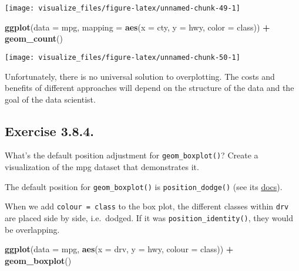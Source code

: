 \documentclass[]{book}
\newenvironment{Shaded}{\begin{snugshade}}{\end{snugshade}}
\newcommand{\DataTypeTok}[1]{\textcolor[rgb]{0.13,0.29,0.53}{#1}}
\newcommand{\KeywordTok}[1]{\textcolor[rgb]{0.13,0.29,0.53}{\textbf{#1}}}
\newcommand{\NormalTok}[1]{#1}
\newcommand{\OperatorTok}[1]{\textcolor[rgb]{0.81,0.36,0.00}{\textbf{#1}}}
\newcommand{\StringTok}[1]{\textcolor[rgb]{0.31,0.60,0.02}{#1}}
\theoremstyle{plain}
\theoremstyle{remark}
\begin{document}
\begin{center}\texttt{[image: visualize\_files/figure-latex/unnamed-chunk-49-1]} \end{center}

\begin{Shaded}
\begin{Highlighting}[]
\KeywordTok{ggplot}\NormalTok{(}\DataTypeTok{data =}\NormalTok{ mpg, }\DataTypeTok{mapping =} \KeywordTok{aes}\NormalTok{(}\DataTypeTok{x =}\NormalTok{ cty, }\DataTypeTok{y =}\NormalTok{ hwy, }\DataTypeTok{color =}\NormalTok{ class)) }\OperatorTok{+}
\StringTok{  }\KeywordTok{geom_count}\NormalTok{()}
\end{Highlighting}
\end{Shaded}

\begin{center}\texttt{[image: visualize\_files/figure-latex/unnamed-chunk-50-1]} \end{center}

Unfortunately, there is no universal solution to overplotting. The costs
and benefits of different approaches will depend on the structure of the
data and the goal of the data scientist.

\hypertarget{exercise-3.8.4.}{%
\subsection*{\texorpdfstring{Exercise
{3.8.4}.}{Exercise 3.8.4.}}\label{exercise-3.8.4.}}

What's the default position adjustment for \texttt{geom\_boxplot()}?
Create a visualization of the mpg dataset that demonstrates it.

The default position for \texttt{geom\_boxplot()} is
\texttt{position\_dodge()} (see its
\href{http://docs.ggplot2.org/current/geom_boxplot.html}{docs}).

When we add \texttt{colour\ =\ class} to the box plot, the different
classes within \texttt{drv} are placed side by side, i.e.~dodged. If it
was \texttt{position\_identity()}, they would be overlapping.

\begin{Shaded}
\begin{Highlighting}[]
\KeywordTok{ggplot}\NormalTok{(}\DataTypeTok{data =}\NormalTok{ mpg, }\KeywordTok{aes}\NormalTok{(}\DataTypeTok{x =}\NormalTok{ drv, }\DataTypeTok{y =}\NormalTok{ hwy, }\DataTypeTok{colour =}\NormalTok{ class)) }\OperatorTok{+}
\StringTok{  }\KeywordTok{geom_boxplot}\NormalTok{()}
\end{Highlighting}
\end{Shaded}
\end{document}
